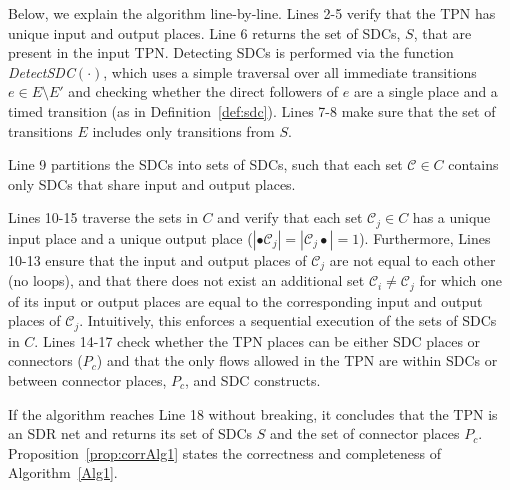   


Below, we explain the algorithm line-by-line. Lines 2-5
verify that the TPN has unique input and output places. Line 6 
returns the set of SDCs, $S$, that 
are present in 
the input TPN. 
Detecting SDCs is performed via the function \emph{DetectSDC}$(\cdot)$,
which uses a simple traversal over all immediate transitions 
$e \in E \setminus E'$ and checking whether the direct followers of $e$ are 
a single place and a timed transition (as in Definition~\ref{def:sdc}). 
Lines 7-8 make sure that the set of transitions $E$ includes
only transitions from $S$. 

Line 9 partitions 
the SDCs into sets of SDCs, such that
each set $\mathcal{C} \in C$ contains only 
SDCs that share input and output places. 

Lines 10-15 traverse the sets in $C$ and 
verify that each set $\mathcal{C}_j \in C$ has a unique input 
place and a unique output place 
($|\bullet\mathcal{C}_j| = |\mathcal{C}_j\bullet| =1$). 
Furthermore, Lines 10-13
ensure that the input and output places of $\mathcal{C}_j$
are not equal to each other (no loops), and that 
there does not exist an additional set $\mathcal{C}_i \neq \mathcal{C}_j$
for which one of its input or output places are equal to 
the corresponding input and output places of $\mathcal{C}_j$. 
Intuitively, this enforces a sequential execution of the sets 
of SDCs in $C$. Lines 14-17 check whether the TPN places
can be either SDC places or connectors ($P_c$)
and that the only flows allowed in the TPN 
are within SDCs or between connector places, $P_c$, 
and SDC constructs.

If the algorithm reaches Line 18 without breaking,
it concludes that the TPN is an SDR net and returns its set of SDCs $S$ and
the set of connector places $P_c$. Proposition~\ref{prop:corrAlg1} states the 
correctness and completeness of Algorithm~\ref{Alg1}.

